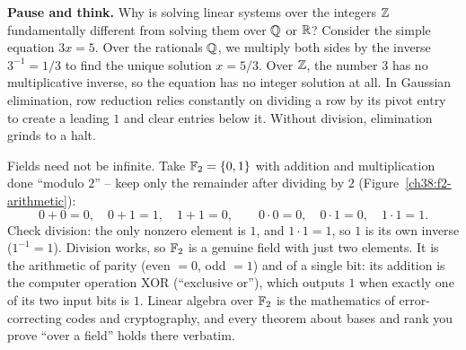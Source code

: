 \begin{recoverybox}
\textbf{Pause and think.} Why is solving linear systems over the integers $\mathbb{Z}$ fundamentally different from solving them over $\mathbb{Q}$ or $\mathbb{R}$?
Consider the simple equation $3x = 5$. Over the rationals $\mathbb{Q}$, we multiply both sides by the inverse $3^{-1} = 1/3$ to find the unique solution $x = 5/3$. Over $\mathbb{Z}$, the number $3$ has no multiplicative inverse, so the equation has no integer solution at all.
In Gaussian elimination, row reduction relies constantly on dividing a row by its pivot entry to create a leading $1$ and clear entries below it. Without division, elimination grinds to a halt.
\end{recoverybox}

\begin{example}\label{ch38:f2}
Fields need not be infinite. Take $\mathbb{F}_2 = \{0, 1\}$ with addition and multiplication done
``modulo $2$'' -- keep only the remainder after dividing by $2$ (Figure~\ref{ch38:f2-arithmetic}):
\[
  0+0=0,\quad 0+1=1,\quad 1+1=0,\qquad
  0\cdot 0 = 0,\quad 0\cdot 1 = 0,\quad 1\cdot 1 = 1.
\]
Check division: the only nonzero element is $1$, and $1\cdot 1 = 1$, so $1$ is its own
inverse ($1^{-1} = 1$). Division works, so $\mathbb{F}_2$ is a genuine field with just two elements.
It is the arithmetic of parity (even $=0$, odd $=1$) and of a single bit: its addition is
the computer operation XOR (``exclusive or''), which outputs $1$ when exactly one of its
two input bits is $1$. Linear algebra over $\mathbb{F}_2$ is the
mathematics of error-correcting codes and cryptography, and every theorem about bases and
rank you prove ``over a field'' holds there verbatim.
\end{example}

